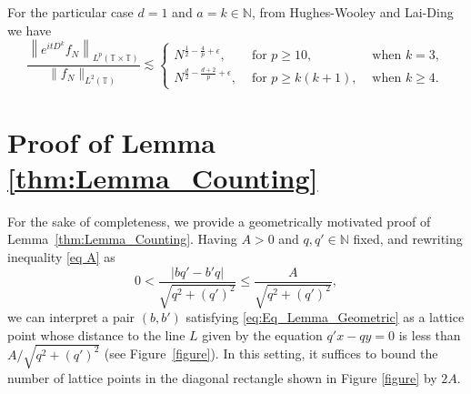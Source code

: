 \documentclass[11pt,reqno]{amsart}
\theoremstyle{definition}
\numberwithin{equation}{section}
\theoremstyle{remark}
\begin{document}
For the particular case $d=1$ and $a = k \in \mathbb N$, from Hughes-Wooley \cite{HughesWooley2021} and Lai-Ding \cite{LaiDing2018} we have
\begin{equation}\label{eq:StrichartzEstimatesFractionalBestOneDimension}
    \frac{\left\lVert e^{itD^k} f_N  \right\rVert_{L^p(\mathbb T \times \mathbb T)}}{\lVert f_N \rVert_{L^2(\mathbb T)}} 
    \lesssim 
    \left\{
    \begin{array}{lll}
      N^{\frac{1}{2} - \frac{4}{p} + \epsilon}, & \text{ for } p \geq 10, & \text{ when } k=3, \\
      N^{\frac{d}{2} - \frac{d+2}{p} + \epsilon}, & \text{ for } p \geq k(k+1), & \text{ when } k \geq 4.
    \end{array}
    \right.
\end{equation}  




\section{Proof of Lemma \ref{thm:Lemma_Counting}}\label{sec:Proof_Of_NT_Lemma}
For the sake of completeness, 
we provide a geometrically motivated proof of Lemma~\ref{thm:Lemma_Counting}. 
Having $A >0$ and $q,q' \in \mathbb{N}$ fixed, and rewriting inequality \eqref{eq A} as
\begin{equation}\label{eq:Eq_Lemma_Geometric}
    0 < \frac{|bq' - b'q|}{\sqrt{q^2 + (q')^2}} \leq \frac{A}{\sqrt{q^2 + (q')^2}}, 
\end{equation}
we can interpret a pair $(b,b')$ satisfying \eqref{eq:Eq_Lemma_Geometric} as a lattice point whose distance to the line $L$ given by the equation $q' x - qy =0$ is less than $A/\sqrt{q^2 + (q')^2}$ (see Figure~\ref{figure}).
In this setting, 
it suffices to bound the number of lattice points in the diagonal rectangle shown in Figure \ref{figure} by $2A$.

    
\end{document}
